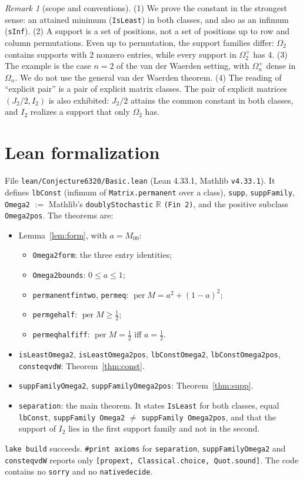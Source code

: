 \documentclass[11pt]{article}
\theoremstyle{definition}
\theoremstyle{remark}
\newtheorem{remark}[theorem]{Remark}
\renewcommand{\_}{\oldus\allowbreak}
\newcommand{\per}{\operatorname{per}}
\begin{document}
\begin{remark}[scope and conventions]
(1) We prove the constant in the strongest sense: an attained minimum (\texttt{IsLeast}) in both
classes, and also as an infimum (\texttt{sInf}). (2) A support is a set of positions, not a set
of positions up to row and column permutations. Even up to permutation, the support families
differ: $\Omega_2$ contains supports with $2$ nonzero entries, while every support in
$\Omega_2^{+}$ has $4$. (3) The example is the case $n=2$ of the van der Waerden setting, with
$\Omega_n^{+}$ dense in $\Omega_n$. We do not use the general van der Waerden theorem. (4) The
reading of ``explicit pair'' is a pair of explicit matrix classes. The pair of explicit matrices
$(J_2/2, I_2)$ is also exhibited: $J_2/2$ attains the common constant in both classes, and $I_2$
realizes a support that only $\Omega_2$ has.
\end{remark}

\section{Lean formalization}

File \texttt{lean/Conjecture6320/Basic.lean} (Lean 4.33.1, Mathlib \texttt{v4.33.1}). It defines
\texttt{lbConst} (infimum of \texttt{Matrix.permanent} over a class), \texttt{supp},
\texttt{suppFamily}, \texttt{Omega2} $:=$ Mathlib's \texttt{doublyStochastic} $\mathbb{R}$
\texttt{(Fin 2)}, and the positive subclass \texttt{Omega2pos}. The theorems are:
\begin{itemize}
\item Lemma~\ref{lem:form}, with $a=M_{00}$:
\begin{itemize}
\item \texttt{Omega2\_form}: the three entry identities;
\item \texttt{Omega2\_bounds}: $0\le a\le1$;
\item \texttt{permanent\_fin\_two}, \texttt{perm\_eq}: $\per M=a^2+(1-a)^2$;
\item \texttt{perm\_ge\_half}: $\per M\ge\tfrac12$;
\item \texttt{perm\_eq\_half\_iff}: $\per M=\tfrac12$ iff $a=\tfrac12$.
\end{itemize}
\item \texttt{isLeast\_Omega2}, \texttt{isLeast\_Omega2pos}, \texttt{lbConst\_Omega2},
\texttt{lbConst\_Omega2pos}, \texttt{const\_eq\_vdW}: Theorem~\ref{thm:const}.
\item \texttt{suppFamily\_Omega2}, \texttt{suppFamily\_Omega2pos}: Theorem~\ref{thm:supp}.
\item \texttt{separation}: the main theorem. It states \texttt{IsLeast} for both classes, equal
\texttt{lbConst}, \texttt{suppFamily Omega2} $\neq$ \texttt{suppFamily Omega2pos}, and that the
support of $I_2$ lies in the first support family and not in the second.
\end{itemize}
\texttt{lake build} succeeds. \texttt{\#print axioms} for \texttt{separation},
\texttt{suppFamily\_Omega2} and \texttt{const\_eq\_vdW} reports only
\texttt{[propext, Classical.choice, Quot.sound]}. The code contains no \texttt{sorry} and no
\texttt{native\_decide}.
\end{document}
